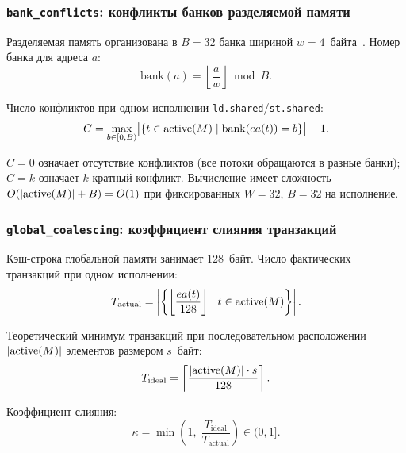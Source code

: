 \subsubsection{\texttt{bank\_conflicts}: конфликты банков разделяемой памяти}

Разделяемая память организована в $B = 32$ банка шириной
$w = 4$~байта~\cite{CUDAProgrammingGuide, AmpereWhitepaper}. Номер банка для адреса $a$:
\begin{equation}
  \mathrm{bank}(a) = \left\lfloor \frac{a}{w} \right\rfloor \bmod B.
\end{equation}

Число конфликтов при одном исполнении \texttt{ld.shared}/\texttt{st.shared}:
\begin{equation}
  \label{eq:bank_conflicts}
  C = \max_{b \in [0,B)}\bigl|\{t \in \mathrm{active}(M) \mid \mathrm{bank}(ea(t)) = b\}\bigr| - 1.
\end{equation}

$C = 0$ означает отсутствие конфликтов (все потоки обращаются в разные
банки); $C = k$ означает $k$-кратный конфликт. Вычисление имеет
сложность $O(|\mathrm{active}(M)| + B) = O(1)$ при фиксированных $W{=}32$, $B{=}32$ на исполнение.

\subsubsection{\texttt{global\_coalescing}: коэффициент слияния транзакций}

Кэш-строка глобальной памяти занимает 128~байт. Число фактических
транзакций при одном исполнении:
\begin{equation}
  \label{eq:t_actual}
  T_{\mathrm{actual}} =
    \left|\left\{\left\lfloor\frac{ea(t)}{128}\right\rfloor
    \;\middle|\; t \in \mathrm{active}(M)\right\}\right|.
\end{equation}

Теоретический минимум транзакций при последовательном расположении
$|\mathrm{active}(M)|$ элементов размером $s$~байт:
\begin{equation}
  T_{\mathrm{ideal}} =
    \left\lceil \frac{|\mathrm{active}(M)| \cdot s}{128} \right\rceil.
\end{equation}

Коэффициент слияния:
\begin{equation}
  \label{eq:coalescing}
  \kappa = \min\!\left(1,\;\frac{T_{\mathrm{ideal}}}{T_{\mathrm{actual}}}\right)
  \in (0, 1].
\end{equation}

